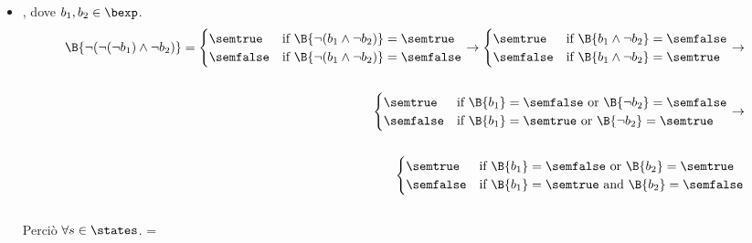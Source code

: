 {\begin{enumerate}[label=\alph*)]
\begin{itemize}
    \item {}, dove $b_1, b_2 \in \bexp$. \\
    \begin{align*}
      \B{\lnot( \lnot( \lnot b_1) \land \lnot b_2)} =
      \begin{cases}
      \semtrue &
      \mbox{if} \ \B{\lnot(b_1 \land \lnot b_2)} = \semtrue \\
      \semfalse &
      \mbox{if} \  \B{\lnot(b_1 \land \lnot b_2)} = \semfalse \\
      \end{cases}
      \rightarrow
      \begin{cases}
      \semtrue &
      \mbox{if} \ \B{b_1 \land \lnot b_2} = \semfalse \\
      \semfalse &
      \mbox{if} \ \B{b_1 \land \lnot b_2} = \semtrue \\
      \end{cases}
      \rightarrow \\ \\
      \begin{cases}
      \semtrue &
      \mbox{if} \ \B{b_1} = \semfalse
                  \mbox{ or }
                  \B{\lnot b_2} = \semfalse \\
      \semfalse &
      \mbox{if} \ \B{b_1} = \semtrue
                  \mbox{ or }
                  \B{\lnot b_2} = \semtrue \\
      \end{cases}
      \rightarrow \\ \\
      \begin{cases}
      \semtrue &
      \mbox{if} \ \B{b_1} = \semfalse
                  \mbox{ or }
                  \B{b_2} = \semtrue \\
      \semfalse &
      \mbox{if} \ \B{b_1} = \semtrue
                  \mbox{ and }
                  \B{b_2} = \semfalse \\
      \end{cases}
    \end{align*} \\
      Perciò $\forall s \in \states$. =
       \\
    

\end{itemize}
\end{enumerate}}
